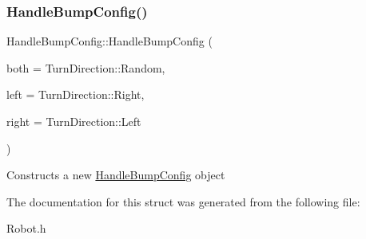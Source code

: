 \subsubsection{\texorpdfstring{Handle\+Bump\+Config()}{HandleBumpConfig()}}
{\footnotesize\ttfamily Handle\+Bump\+Config\+::\+Handle\+Bump\+Config (\begin{DoxyParamCaption}\item[{Turn\+Direction\+::\+Enum}]{both = {\ttfamily TurnDirection\+:\+:Random},  }\item[{Turn\+Direction\+::\+Enum}]{left = {\ttfamily TurnDirection\+:\+:Right},  }\item[{Turn\+Direction\+::\+Enum}]{right = {\ttfamily TurnDirection\+:\+:Left} }\end{DoxyParamCaption})\hspace{0.3cm}{\ttfamily [inline]}}

Constructs a new \hyperlink{structHandleBumpConfig}{Handle\+Bump\+Config} object 

The documentation for this struct was generated from the following file\+:\begin{DoxyCompactItemize}
\item 
Robot.\+h\end{DoxyCompactItemize}
